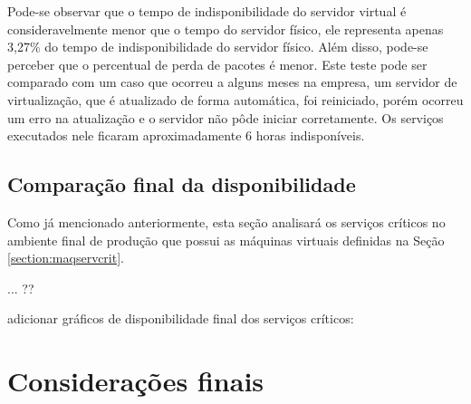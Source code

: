 Pode-se observar que o tempo de indisponibilidade do servidor virtual é consideravelmente menor que o tempo do servidor físico, ele representa 
apenas 3,27\% do tempo de indisponibilidade do servidor físico. Além disso, pode-se perceber que o percentual de perda de pacotes é menor.
Este teste pode ser comparado com um caso que ocorreu a alguns meses na empresa, um servidor de virtualização, que é atualizado de forma automática,
foi reiniciado, porém ocorreu um erro na atualização e o servidor não pôde iniciar corretamente. Os serviços executados nele ficaram 
aproximadamente 6 horas indisponíveis.

\subsection{Comparação final da disponibilidade}
\label{section:comparacaofinal}

Como já mencionado anteriormente, esta seção analisará os serviços críticos no ambiente final de produção que possui as máquinas virtuais
definidas na Seção \ref{section:maqservcrit}. 

... ??

adicionar gráficos de disponibilidade final dos serviços críticos:



\section{Considerações finais}
